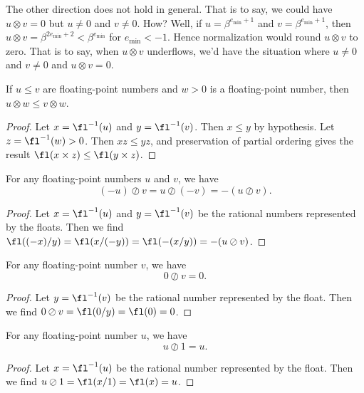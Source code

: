 \begin{rmk}
  The other direction does not hold in general. That is to say, we could
  have $u\otimes v=0$ but $u\neq0$ and $v\neq0$. How? Well, if
  $u=\beta^{e_{\text{min}}+1}$ and $v=\beta^{e_{\text{min}}+1}$, then $u\otimes v=\beta^{2e_{\text{min}}+2}<\beta^{e_{\text{min}}}$
  for $e_{\min}<-1$. Hence normalization would round $u\otimes v$ to zero.
  That is to say, when $u\otimes v$ underflows, we'd have the situation
  where $u\neq0$ and $v\neq0$ and $u\otimes v=0$.
\end{rmk}

\begin{thm}
  If $u\leq v$ are floating-point numbers and $w>0$ is a floating-point
  number, then $u\otimes w\leq v\otimes w$.
\end{thm}
\begin{proof}
  Let $x=\fl^{-1}(u)$ and $y=\fl^{-1}(v)$. Then $x\leq y$ by hypothesis.
  Let $z=\fl^{-1}(w)>0$.
  Then $xz\leq yz$, and preservation of partial ordering gives the result
  $\fl(x\times z)\leq \fl(y\times z)$.
\end{proof}

\begin{thm}
  For any floating-point numbers $u$ and $v$, we have
  \begin{equation*}
    (-u)\oslash v = u\oslash(-v)=-(u\oslash v).
  \end{equation*}
\end{thm}
\begin{proof}
  Let $x=\fl^{-1}(u)$ and $y=\fl^{-1}(v)$ be the rational numbers
  represented by the floats. Then we find
  $\fl((-x)/y)=\fl(x/(-y))=\fl(-(x/y)) = -(u\oslash v)$.
\end{proof}

\begin{thm}
  For any floating-point number $v$, we have
  \begin{equation*}
    0\oslash v = 0.
  \end{equation*}
\end{thm}
\begin{proof}
  Let $y=\fl^{-1}(v)$ be the rational number
  represented by the float. Then we find
  $0\oslash v = \fl(0/y) = \fl(0) = 0$.
\end{proof}

\begin{thm}
  For any floating-point number $u$, we have
  \begin{equation*}
    u\oslash 1 = u.
  \end{equation*}
\end{thm}
\begin{proof}
  Let $x=\fl^{-1}(u)$ be the rational number
  represented by the float. Then we find
  $u\oslash 1 = \fl(x/1) = \fl(x) = u$.
\end{proof}


